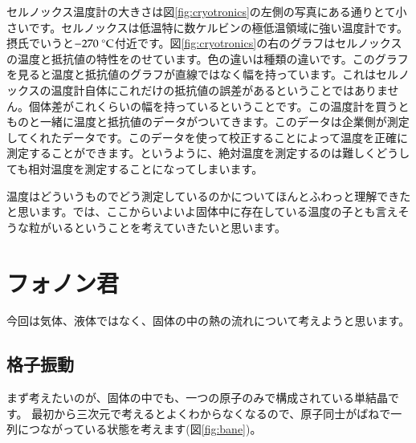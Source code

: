 \documentclass[10pt,b5paper,papersize,dvipdfmx]{jsbook}
\begin{document}
セルノックス温度計の大きさは図\ref{fig:cryotronics}の左側の写真にある通りとて小さいです。セルノックスは低温特に数ケルビンの極低温領域に強い温度計です。摂氏でいうと$-270\ ^\circ \rm{C}$付近です。図\ref{fig:cryotronics}の右のグラフはセルノックスの温度と抵抗値の特性をのせています。色の違いは種類の違いです。このグラフを見ると温度と抵抗値のグラフが直線ではなく幅を持っています。これはセルノックスの温度計自体にこれだけの抵抗値の誤差があるということではありません。個体差がこれくらいの幅を持っているということです。この温度計を買うとものと一緒に温度と抵抗値のデータがついてきます。このデータは企業側が測定してくれたデータです。このデータを使って校正することによって温度を正確に測定することができます。というように、絶対温度を測定するのは難しくどうしても相対温度を測定することになってしまいます。\par
温度はどういうものでどう測定しているのかについてほんとふわっと理解できたと思います。では、ここからいよいよ固体中に存在している温度の子とも言えそうな粒がいるということを考えていきたいと思います。

\section{フォノン君}
今回は気体、液体ではなく、固体の中の熱の流れについて考えようと思います。
\subsection{格子振動}
まず考えたいのが、固体の中でも、一つの原子のみで構成されている単結晶です。
最初から三次元で考えるとよくわからなくなるので、原子同士がばねで一列につながっている状態を考えます(図\ref{fig:bane})。\par
\end{document}
